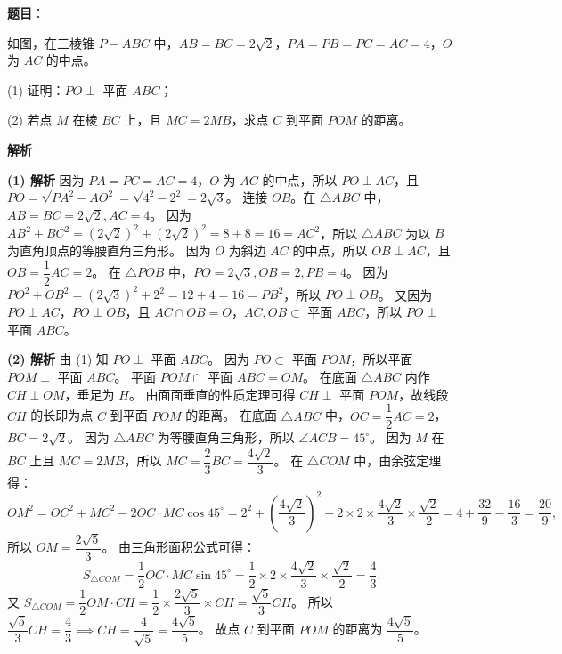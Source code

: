 \begin{answer}

\textbf{题目}：

如图，在三棱锥 $P-ABC$ 中，$AB=BC=2\sqrt2$，$PA=PB=PC=AC=4$，$O$ 为 $AC$ 的中点。
\nopagebreak[4]
\begin{center}\end{center}
\nopagebreak[4]
(1) 证明：$PO\perp$ 平面 $ABC$；

(2) 若点 $M$ 在棱 $BC$ 上，且 $MC=2MB$，求点 $C$ 到平面 $POM$ 的距离。

\textbf{解析}

\textbf{(1) 解析} 因为 $PA=PC=AC=4$，$O$ 为 $AC$ 的中点，所以 $PO\perp AC$，且 $PO = \sqrt{PA^2-AO^2} = \sqrt{4^2-2^2} = 2\sqrt3$。
连接 $OB$。在 $\triangle ABC$ 中，$AB=BC=2\sqrt2, AC=4$。
因为 $AB^2+BC^2 = (2\sqrt2)^2+(2\sqrt2)^2 = 8+8=16=AC^2$，所以 $\triangle ABC$ 为以 $B$ 为直角顶点的等腰直角三角形。
因为 $O$ 为斜边 $AC$ 的中点，所以 $OB\perp AC$，且 $OB = \dfrac12 AC = 2$。
在 $\triangle POB$ 中，$PO=2\sqrt3, OB=2, PB=4$。
因为 $PO^2+OB^2 = (2\sqrt3)^2+2^2 = 12+4=16=PB^2$，所以 $PO\perp OB$。
又因为 $PO\perp AC$，$PO\perp OB$，且 $AC\cap OB=O$，$AC,OB\subset$ 平面 $ABC$，所以 $PO\perp$ 平面 $ABC$。

\textbf{(2) 解析} 由 (1) 知 $PO\perp$ 平面 $ABC$。
因为 $PO\subset$ 平面 $POM$，所以平面 $POM\perp$ 平面 $ABC$。
平面 $POM\cap$ 平面 $ABC = OM$。
在底面 $\triangle ABC$ 内作 $CH\perp OM$，垂足为 $H$。
由面面垂直的性质定理可得 $CH\perp$ 平面 $POM$，故线段 $CH$ 的长即为点 $C$ 到平面 $POM$ 的距离。
在底面 $\triangle ABC$ 中，$OC = \dfrac12 AC = 2$，$BC=2\sqrt2$。
因为 $\triangle ABC$ 为等腰直角三角形，所以 $\angle ACB = 45^\circ$。
因为 $M$ 在 $BC$ 上且 $MC=2MB$，所以 $MC = \dfrac23 BC = \dfrac{4\sqrt2}{3}$。
在 $\triangle COM$ 中，由余弦定理得：
\nopagebreak[4]
\[OM^2 = OC^2 + MC^2 - 2OC\cdot MC\cos 45^\circ = 2^2 + \left(\dfrac{4\sqrt2}{3}\right)^2 - 2\times 2\times\dfrac{4\sqrt2}{3}\times\dfrac{\sqrt2}{2} = 4 + \dfrac{32}{9} - \dfrac{16}{3} = \dfrac{20}{9},\]
所以 $OM = \dfrac{2\sqrt5}{3}$。
由三角形面积公式可得：
\nopagebreak[4]
\[S_{\triangle COM} = \dfrac12 OC\cdot MC\sin 45^\circ = \dfrac12\times 2\times\dfrac{4\sqrt2}{3}\times\dfrac{\sqrt2}{2} = \dfrac43.\]
又 $S_{\triangle COM} = \dfrac12 OM\cdot CH = \dfrac12\times\dfrac{2\sqrt5}{3}\times CH = \dfrac{\sqrt5}{3} CH$。
所以 $\dfrac{\sqrt5}{3} CH = \dfrac43 \implies CH = \dfrac{4}{\sqrt5} = \dfrac{4\sqrt5}{5}$。
故点 $C$ 到平面 $POM$ 的距离为 $\dfrac{4\sqrt5}{5}$。



\end{answer}

